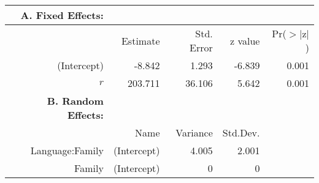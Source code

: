 \begin{tabular}{rrrrr}
 {\bf A. Fixed Effects:} \\
\hline
 & Estimate & Std. Error & z value & Pr($>$$|$z$|$) \\ 
  \hline
(Intercept) & -8.842 & 1.293 & -6.839 & 0.001 \\ 
  $r$ & 203.711 & 36.106 & 5.642 & 0.001 \\ 

\hline \hline
{\bf B. Random Effects:} \\
\hline
& Name & Variance & Std.Dev. \\
\hline
Language:Family & (Intercept) & 4.005 & 2.001 \\
Family & (Intercept) & 0 & 0 \\
\end{tabular}
